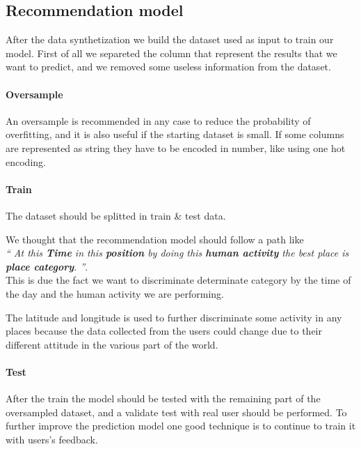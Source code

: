 \documentclass[../../main]{subfiles}
\begin{document}
\subsection{Recommendation model}
\label{ss:recommendation-model}

After the data synthetization we build the dataset used as input to train our model. 
First of all we separeted the column that represent the results that we want to predict, and we removed some useless information from the dataset.
\paragraph*{Oversample}
An oversample is recommended in any case to reduce the probability of overfitting, and it is also useful if the starting dataset is small.
If some columns are represented as string they have to be encoded in number, like using one hot encoding.
\paragraph*{Train}
\label{paragraph:train_design}
The dataset should be splitted in train \& test data.

We thought that the recommendation model should follow a path like \\\textit{`` At this \textbf{Time} in this \textbf{position} by doing this \textbf{human activity} the best place is \textbf{place category}. ''}.
\\This is due the fact we want to discriminate determinate category by the time of the day and the human activity we are performing.

The latitude and longitude is used to further discriminate some activity in any places because the data collected from the users could change due to their different attitude in the various part of the world.
\paragraph*{Test}
After the train the model should be tested with the remaining part of the oversampled dataset, and a validate test with real user should be performed.
To further improve the prediction model one good technique is to continue to train it with users's feedback.
\end{document}
